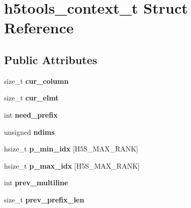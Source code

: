 \hypertarget{structh5tools__context__t}{}\section{h5tools\+\_\+context\+\_\+t Struct Reference}
\label{structh5tools__context__t}
\subsection*{Public Attributes}
\begin{DoxyCompactItemize}
\item 
\mbox{\label{structh5tools__context__t_a28e8bd6a86c62d34c44390599a47f99b}} 
size\+\_\+t {\bfseries cur\+\_\+column}
\item 
\mbox{\label{structh5tools__context__t_aeedb664173ea5cc92ed6d320da7cd2b3}} 
size\+\_\+t {\bfseries cur\+\_\+elmt}
\item 
\mbox{\label{structh5tools__context__t_a8f0590e5a9ec39707529f208b1172b5c}} 
int {\bfseries need\+\_\+prefix}
\item 
\mbox{\label{structh5tools__context__t_a6aa9f1afb8d7587f6873ebc2dea009a8}} 
unsigned {\bfseries ndims}
\item 
\mbox{\label{structh5tools__context__t_afdda015e1a7c410ace6bea504ea88ff6}} 
hsize\+\_\+t {\bfseries p\+\_\+min\+\_\+idx} \mbox{[}H5\+S\+\_\+\+M\+A\+X\+\_\+\+R\+A\+NK\mbox{]}
\item 
\mbox{\label{structh5tools__context__t_a500917c83d3a4ce668e80476afabe07f}} 
hsize\+\_\+t {\bfseries p\+\_\+max\+\_\+idx} \mbox{[}H5\+S\+\_\+\+M\+A\+X\+\_\+\+R\+A\+NK\mbox{]}
\item 
\mbox{\label{structh5tools__context__t_aa685025668c62551ce16edba596d397a}} 
int {\bfseries prev\+\_\+multiline}
\item 
\mbox{\label{structh5tools__context__t_afc3759f245f95cb929b1e7362f4dd62a}} 
size\+\_\+t {\bfseries prev\+\_\+prefix\+\_\+len}

\end{DoxyCompactItemize}
